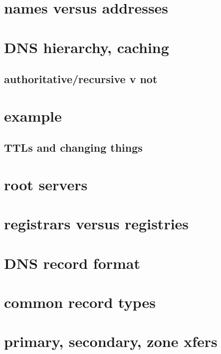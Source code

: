 \section{names versus addresses}


\section{DNS hierarchy, caching}




\subsection{authoritative/recursive v not}


\section{example}


\subsection{TTLs and changing things}



\section{root servers}


\section{registrars versus registries}


\section{DNS record format}


\section{common record types}


\section{primary, secondary, zone xfers}

